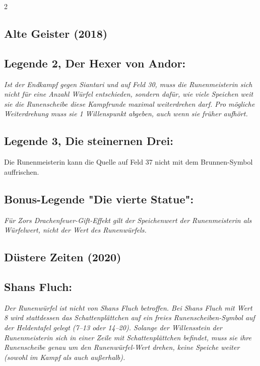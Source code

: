 \documentclass[10pt, a4paper, oneside]{book}
\newcommand{\fan}[1]{\textit{#1}}
\begin{document}
\begin{multicols*}{2}
\begin{bgcolor}[color-ag]
\section{Alte Geister (2018)}



\subsection{Legende 2, Der Hexer von Andor:}

\fan{Ist der Endkampf gegen Siantari und auf Feld 30, muss die Runenmeisterin sich nicht für eine Anzahl Würfel entschieden, sondern dafür, wie viele Speichen weit sie die Runenscheibe diese Kampfrunde maximal weiterdrehen darf. Pro mögliche Weiterdrehung muss sie 1 Willenspunkt abgeben, auch wenn sie früher aufhört.}



\subsection{Legende 3, Die steinernen Drei:}

Die Runenmeisterin kann die Quelle auf Feld 37 nicht mit dem Brunnen-Symbol auffrischen.
\supercite{ag-begleitheft,88563}




\subsection{Bonus-Legende "Die vierte Statue":}

\fan{Für Zors Drachenfeuer-Gift-Effekt gilt der Speichenwert der Runenmeisterin als Würfelwert, nicht der Wert des Runenwürfels.}

\end{bgcolor}





\begin{bgcolor}[color-dz]
\section{Düstere Zeiten (2020)}

\subsection{Shans Fluch:}

\fan{Der Runenwürfel ist nicht von Shans Fluch betroffen. Bei Shans Fluch mit Wert 8 wird stattdessen das Schattenplättchen auf ein freies Runenscheiben-Symbol auf der Heldentafel gelegt (7–13 oder 14–20). Solange der Willensstein der Runenmeisterin sich in einer Zeile mit Schattenplättchen befindet, muss sie ihre Runenscheibe genau um den Runenwürfel-Wert drehen, keine Speiche weiter (sowohl im Kampf als auch außerhalb).}


\end{bgcolor}
\end{multicols*}
\end{document}
